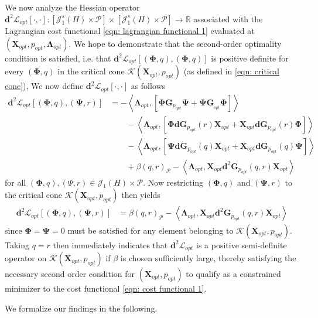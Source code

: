 \documentclass{amsart}
\newcommand{\sJ}{\mathscr J}
\newcommand{\p}[1]{\left( {#1} \right)}
\newcommand{\br}[1]{\left[ #1 \right]}
\newcommand{\dual}[1]{\left< #1 \right>}
\newcommand{\sP}{\mathcal{P}}
\newcommand{\bX}{\mathbf X}
\newcommand{\bG}{\mathbf G}
\newcommand{\bPhi}{\boldsymbol{\Phi}}
\newcommand{\bLambda}{\boldsymbol{\Lambda}}
\newcommand{\bd}{\mathbf d}
\newcommand{\bPsi}{\boldsymbol{\Psi}}
\begin{document}
We now analyze the Hessian operator $\bd^2 \mathcal L_{opt}\br{\cdot, \cdot} : \br{\sJ_1^s(H) \times \sP}\times\br{\sJ_1^s(H) \times \sP} \rightarrow \mathbb R$ associated with the Lagrangian cost functional \eqref{eqn: lagrangian functional 1} evaluated at $\p{\bX_{opt}, p_{opt}, \bLambda_{opt}}$. We hope to demonstrate that the second-order optimality condition is satisfied, i.e. that $\bd^2 \mathcal L_{opt}\br{(\bPhi,q),(\bPhi,q)}$ is positive definite for every $\p{\bPhi, q}$ in the critical cone $\mathcal K \p{\bX_{opt}, p_{opt}}$ (as defined in \eqref{eqn: critical cone}), We now define $\bd^2\mathcal L_{opt}\br{\cdot, \cdot}$ as follows
$$
\begin{aligned}
\bd^2\mathcal L_{opt}\br{(\bPhi,q),(\bPsi,r)} &=
    -\dual{\bLambda_{opt}, \br{\bPhi\bG_{p_{opt}}\bPsi + \bPsi\bG_{_{opt}}\bPhi}}\\
    &\qquad-\dual{\bLambda_{opt}, \br{\bPhi \bd\bG_{p_{opt}}(r)\bX_{opt}+\bX_{opt}\bd\bG_{p_{opt}}(r)\bPhi}} \\
    &\qquad-\dual{\bLambda_{opt}, \br{\bPsi \bd\bG_{p_{opt}}(q)\bX_{opt}+\bX_{opt}\bd\bG_{p_{opt}}(q)\bPsi}} \\
    &\qquad+ \beta\p{q,r}_{\sP} - \dual{ \bLambda_{opt}, \bX_{opt} \bd^2\bG_{p_{opt}}\p{q,r}\bX_{opt}} 
\end{aligned}
$$
for all $\p{\bPhi, q},\p{\Psi, r}\in\sJ_1(H)\times \sP$. Now restricting $\p{\bPhi, q}$ and $\p{\bPsi, r}$ to the critical cone $\mathcal K(\bX_{opt}, p_{opt})$ then yields
$$
\begin{aligned}
\bd^2\mathcal L_{opt}\br{(\bPhi,q),(\bPsi,r)} &=
   \beta\p{q,r}_{\sP} - \dual{ \bLambda_{opt}, \bX_{opt} \bd^2\bG_{p_{opt}}\p{q,r}\bX_{opt}} 
\end{aligned}
$$
since $\bPhi = \bPsi = 0$ must be satisfied for any element belonging to $\mathcal K\p{\bX_{opt}, p_{opt}}$. Taking $q = r$ then immediately indicates that $\bd^2 \mathcal L_{opt}$ is a positive semi-definite operator on $\mathcal K(\bX_{opt}, p_{opt})$ if $\beta$ is chosen sufficiently large, thereby satisfying the necessary second order condition for $\p{\bX_{opt}, p_{opt}}$ to qualify as a constrained minimizer to the cost functional \eqref{eqn: cost functional 1}. 

We formalize our findings in the following. 
\end{document}
